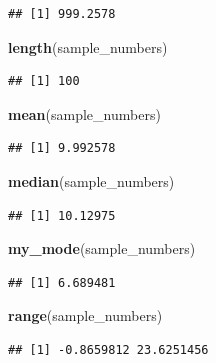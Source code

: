 \documentclass[]{book}
\newenvironment{Shaded}{\begin{snugshade}}{\end{snugshade}}
\newcommand{\KeywordTok}[1]{\textcolor[rgb]{0.13,0.29,0.53}{\textbf{#1}}}
\newcommand{\NormalTok}[1]{#1}
\begin{document}
\begin{verbatim}
## [1] 999.2578
\end{verbatim}

\begin{Shaded}
\begin{Highlighting}[]
\KeywordTok{length}\NormalTok{(sample_numbers)}
\end{Highlighting}
\end{Shaded}

\begin{verbatim}
## [1] 100
\end{verbatim}

\begin{Shaded}
\begin{Highlighting}[]
\KeywordTok{mean}\NormalTok{(sample_numbers)}
\end{Highlighting}
\end{Shaded}

\begin{verbatim}
## [1] 9.992578
\end{verbatim}

\begin{Shaded}
\begin{Highlighting}[]
\KeywordTok{median}\NormalTok{(sample_numbers)}
\end{Highlighting}
\end{Shaded}

\begin{verbatim}
## [1] 10.12975
\end{verbatim}

\begin{Shaded}
\begin{Highlighting}[]
\KeywordTok{my_mode}\NormalTok{(sample_numbers)}
\end{Highlighting}
\end{Shaded}

\begin{verbatim}
## [1] 6.689481
\end{verbatim}

\begin{Shaded}
\begin{Highlighting}[]
\KeywordTok{range}\NormalTok{(sample_numbers)}
\end{Highlighting}
\end{Shaded}

\begin{verbatim}
## [1] -0.8659812 23.6251456
\end{verbatim}
\end{document}
